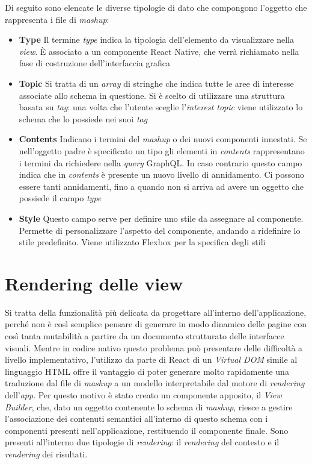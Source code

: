 Di seguito sono elencate le diverse tipologie di dato che compongono l'oggetto che rappresenta i file di \emph{mashup}:

\begin{itemize}
	\item \textbf{Type}
	Il termine \emph{type} indica la tipologia dell'elemento da visualizzare nella \emph{view}. È associato a un componente React Native, che verrà richiamato nella fase di costruzione dell'interfaccia grafica
	\item \textbf{Topic}
	Si tratta di un \emph{array} di stringhe che indica tutte le aree di interesse associate allo schema in questione. Si è scelto di utilizzare una struttura basata su \emph{tag}: una volta che l’utente sceglie l’\emph{interest topic} viene utilizzato lo schema che lo possiede nei suoi \emph{tag} 
	\item \textbf{Contents}
	Indicano i termini del \emph{mashup} o dei nuovi componenti innestati. Se nell'oggetto padre è specificato un tipo gli elementi in \emph{contents} rappresentano i termini da richiedere nella \emph{query} GraphQL. In caso contrario questo campo indica che in \emph{contents} è presente un nuovo livello di annidamento. Ci possono essere tanti annidamenti, fino a quando non si arriva ad avere un oggetto che possiede il campo \emph{type}
	\item \textbf{Style}
	Questo campo serve per definire uno stile da assegnare al componente. Permette di personalizzare l’aspetto del componente, andando a ridefinire lo stile predefinito. Viene utilizzato Flexbox per la specifica degli stili
\end{itemize}

\section{Rendering delle view}\label{sec:rendering-view}

Si tratta della funzionalità più delicata da progettare all'interno dell'applicazione, perché non è così semplice pensare di generare in modo dinamico delle pagine con così tanta mutabilità a partire da un documento strutturato delle interfacce visuali.
Mentre in codice nativo questo problema può presentare delle difficoltà a livello implementativo, l'utilizzo da parte di React di un \emph{Virtual DOM} simile al linguaggio HTML offre il vantaggio di poter generare molto rapidamente una traduzione dal file di \emph{mashup} a un modello interpretabile dal motore di \emph{rendering} dell'\emph{app}.
Per questo motivo è stato creato un componente apposito, il \emph{View Builder}, che, dato un oggetto contenente lo schema di \emph{mashup}, riesce a gestire l'associazione dei contenuti semantici all'interno di questo schema con i componenti presenti nell'applicazione, restituendo il componente finale.
Sono presenti all'interno due tipologie di \emph{rendering}: il \emph{rendering} del contesto e il \emph{rendering} dei risultati.

